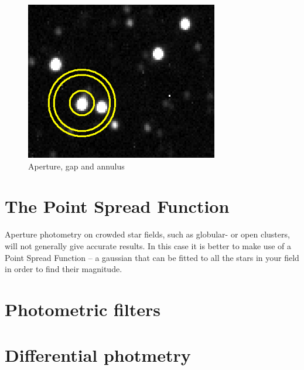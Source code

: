\documentclass[12pt,twoside,a4paper]{report}
\begin{document}
 \begin{figure}[ht]
  \centering
    \includegraphics[width=0.75\textwidth]{documentation_images/annulus.png}
    \caption{\label{fig:annulus}Aperture, gap and annulus}
 \end{figure}

\section{The Point Spread Function}

Aperture photometry on crowded star fields, such as globular- or open clusters, will not generally give accurate results. In this case it is better to make use of a Point Spread Function -- a gaussian that can be fitted to all the stars in your field in order to find their magnitude.


\section{Photometric filters}

\section{Differential photmetry}




\end{document}
